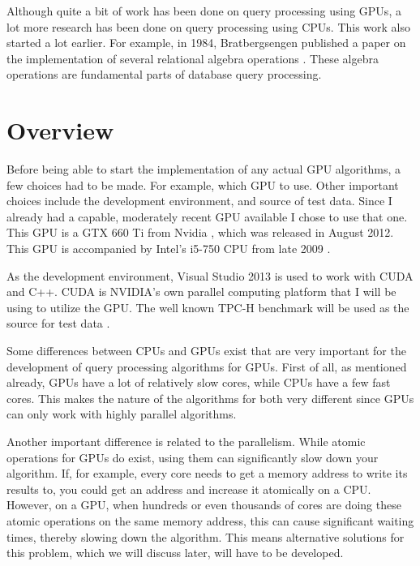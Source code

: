 \documentclass[a4paper,titlepage]{article}
\begin{document}
Although quite a bit of work has been done on query processing using GPUs, a lot more research has been done on query processing using CPUs. This work also started a lot earlier. For example, in 1984, Bratbergsengen published a paper on the implementation of several relational algebra operations \cite{bratbergsengen1984}. These algebra operations are fundamental parts of database query processing.

\section{Overview}
\label{sec:overview}
Before being able to start the implementation of any actual GPU algorithms, a few choices had to be made. For example, which GPU to use. Other important choices include the development environment, and source of test data. Since I already had a capable, moderately recent GPU available I chose to use that one. This GPU is a GTX 660 Ti from Nvidia \cite{gtx660ti}, which was released in August 2012. This GPU is accompanied by Intel's i5-750 CPU from late 2009 \cite{i5-750}.

As the development environment, Visual Studio 2013 is used to work with CUDA \cite{CUDA} and C++. CUDA is NVIDIA's own parallel computing platform that I will be using to utilize the GPU. The well known TPC-H benchmark will be used as the source for test data \cite{tpc-h}.

Some differences between CPUs and GPUs exist that are very important for the development of query processing algorithms for GPUs. First of all, as mentioned already, GPUs have a lot of relatively slow cores, while CPUs have a few fast cores. This makes the nature of the algorithms for both very different since GPUs can only work with highly parallel algorithms.

Another important difference is related to the parallelism. While atomic operations for GPUs do exist, using them can significantly slow down your algorithm. If, for example, every core needs to get a memory address to write its results to, you could get an address and increase it atomically on a CPU. However, on a GPU, when hundreds or even thousands of cores are doing these atomic operations on the same memory address, this can cause significant waiting times, thereby slowing down the algorithm. This means alternative solutions for this problem, which we will discuss later, will have to be developed.

{}

\end{document}
